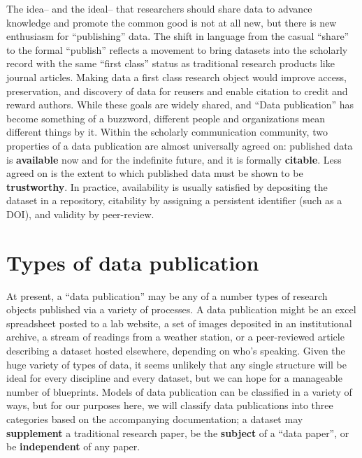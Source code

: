 \documentclass[10pt,a4paper,twocolumn]{article}
\begin{document}
The idea– and the ideal– that researchers should share data to advance knowledge and promote the common good is not at all new, but there is new enthusiasm for ``publishing'' data.  
The shift in language from the casual ``share'' to the formal ``publish'' reflects a movement to bring datasets into the scholarly record with the same ``first class'' status as traditional research products like journal articles.  
Making data a first class research object would improve access, preservation, and discovery of data for reusers and enable citation to credit and reward authors.
While these goals are widely shared, and ``Data publication'' has become something of a buzzword, different people and organizations mean different things by it.
Within the scholarly communication community, two properties of a data publication are almost universally agreed on: published data is \textbf{available} now and for the indefinite future, and it is formally \textbf{citable}. 
Less agreed on is the extent to which published data must be shown to be \textbf{trustworthy}.
In practice, availability is usually satisfied by depositing the dataset in a repository, citability by assigning a persistent identifier (such as a DOI), and validity by peer-review.


\section*{Types of data publication}\label{types-of-data-publication}

At present, a ``data publication'' may be any of a number types of research objects published via a variety of processes.
A data publication might be an excel spreadsheet posted to a lab website, a set of images deposited in an institutional archive, a stream of readings from a weather station, or a peer-reviewed article describing a dataset hosted elsewhere, depending on who's speaking.
Given the huge variety of types of data, it seems unlikely that any single structure will be ideal for every discipline and every dataset, but we can hope for a manageable number of blueprints. 
Models of data publication can be classified in a variety of ways, but for our purposes here, we will classify data publications into three categories based on the accompanying documentation; a dataset may \textbf{supplement} a traditional research paper, be the \textbf{subject} of a ``data paper'', or be \textbf{independent} of any paper.
\end{document}
